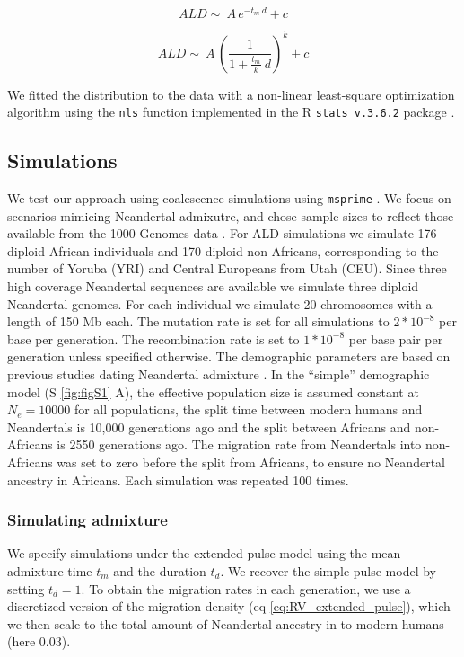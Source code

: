 \documentclass[]{article}
\begin{document}
\begin{equation}
\label{eq:simple_pulse_tail_inf}
ALD \sim\ A\,e^{-t_m \:d}+c
\end{equation}

\begin{equation}
\label{eq:extended_pulse_tail_inf}
ALD \sim\ A\,\left( \frac{1}{1 + \frac{t_m}{k} \:d}\right) ^k+c
\end{equation}

We fitted the distribution to the data with  a non-linear least-square optimization algorithm
using the \texttt{nls} function implemented in the R \texttt{stats v.3.6.2} package \citep{R_Core_Team_2019}.


\subsection{Simulations}\label{simulations}

We test our approach using coalescence simulations using  \texttt{msprime} 
\citep{kelleher_efficient_2016}. We focus on scenarios mimicing Neandertal admixutre, and chose sample sizes to reflect those available from the 1000 Genomes data \citep{the_1000_genomes_project_consortium_global_2015}. For ALD simulations we simulate 176 diploid
African individuals and 170 diploid non-Africans, corresponding to the
number of Yoruba (YRI) and Central Europeans from Utah (CEU). 
Since three high coverage Neandertal sequences are available \citep{prufer_complete_2013,prufer_high-coverage_2017,mafessoni_high_coverage_2020} we  simulate three diploid Neandertal genomes. For each individual we simulate 20
chromosomes with a length of 150 Mb each. The mutation rate is set for
all simulations to \(2*10^{-8}\) per base per generation. The
recombination rate is set to \(1*10^{-8}\) per base pair per generation
unless specified otherwise. The demographic parameters are based on
previous studies dating Neandertal admixture
\citep{sankararaman_date_2012,fu_genome_2014,moorjani_genetic_2016}. In
the ``simple'' demographic model (S \ref{fig:figS1} A), the effective
population size is assumed constant at $N_e=10000$ for all populations, the
split time between modern humans and Neandertals is 10,000 generations
ago and the split between Africans and non-Africans is 2550
generations ago. The migration rate from Neandertals into non-Africans
was set to zero before the split from Africans, to ensure no Neandertal
ancestry in Africans. Each simulation was repeated 100 times. 


\subsubsection{Simulating admixture}\label{Simulating the expanded pulse}
We specify simulations under the extended pulse model using the mean admixture time $t_m$ and the duration $t_d$. We recover the simple pulse model by setting $t_d=1$. To obtain the migration rates in each generation, we use a discretized version of the migration density (eq \ref{eq:RV_extended_pulse}), which we then scale to the total amount of Neandertal ancestry in to modern humans (here 0.03). 
\end{document}
